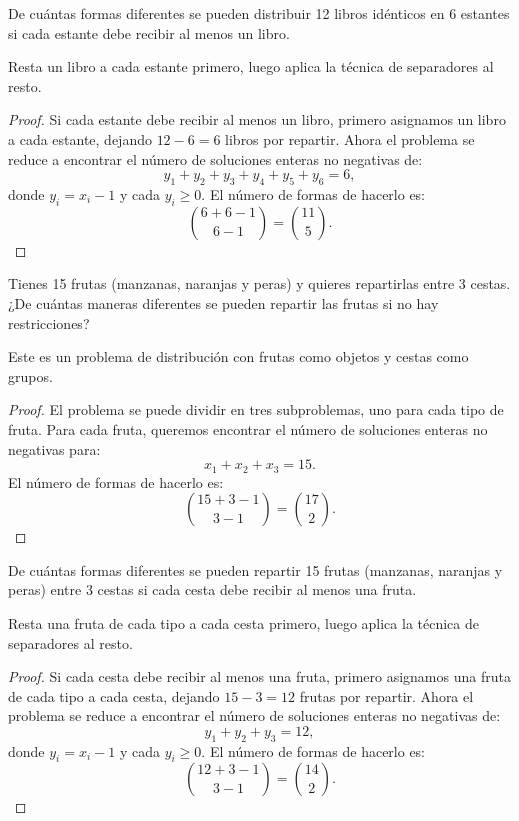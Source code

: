 \documentclass[11pt]{scrartcl}
\begin{document}
\begin{problem}
De cuántas formas diferentes se pueden distribuir 12 libros idénticos en 6 estantes si cada estante debe recibir al menos un libro.
\begin{hint}
Resta un libro a cada estante primero, luego aplica la técnica de separadores al resto.
\begin{proof}
Si cada estante debe recibir al menos un libro, primero asignamos un libro a cada estante, dejando \(12 - 6 = 6\) libros por repartir. Ahora el problema se reduce a encontrar el número de soluciones enteras no negativas de:
\[ y_1 + y_2 + y_3 + y_4 + y_5 + y_6 = 6, \]
donde \(y_i = x_i - 1\) y cada \(y_i \geq 0\). El número de formas de hacerlo es:
\[ \binom{6+6-1}{6-1} = \binom{11}{5}. \]
\end{proof}
\end{hint}
\end{problem}

\begin{problem}
Tienes 15 frutas (manzanas, naranjas y peras) y quieres repartirlas entre 3 cestas. ¿De cuántas maneras diferentes se pueden repartir las frutas si no hay restricciones?
\begin{hint}
Este es un problema de distribución con frutas como objetos y cestas como grupos.
\begin{proof}
El problema se puede dividir en tres subproblemas, uno para cada tipo de fruta. Para cada fruta, queremos encontrar el número de soluciones enteras no negativas para:
\[ x_1 + x_2 + x_3 = 15. \]
El número de formas de hacerlo es:
\[ \binom{15+3-1}{3-1} = \binom{17}{2}. \]
\end{proof}
\end{hint}
\end{problem}

\begin{problem}
De cuántas formas diferentes se pueden repartir 15 frutas (manzanas, naranjas y peras) entre 3 cestas si cada cesta debe recibir al menos una fruta.
\begin{hint}
Resta una fruta de cada tipo a cada cesta primero, luego aplica la técnica de separadores al resto.
\begin{proof}
Si cada cesta debe recibir al menos una fruta, primero asignamos una fruta de cada tipo a cada cesta, dejando \(15 - 3 = 12\) frutas por repartir. Ahora el problema se reduce a encontrar el número de soluciones enteras no negativas de:
\[ y_1 + y_2 + y_3 = 12, \]
donde \(y_i = x_i - 1\) y cada \(y_i \geq 0\). El número de formas de hacerlo es:
\[ \binom{12+3-1}{3-1} = \binom{14}{2}. \]
\end{proof}
\end{hint}
\end{problem}
\end{document}
